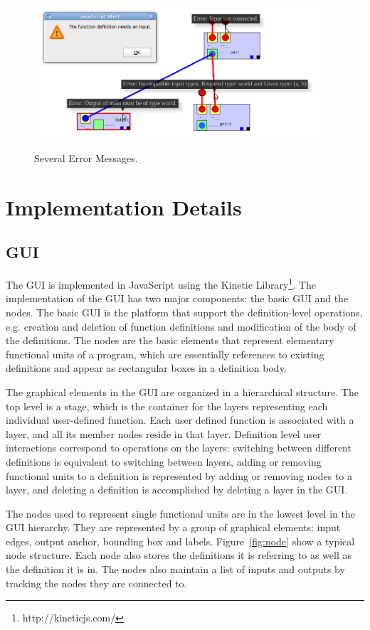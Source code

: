 \documentclass[12pt,UTF8,a4]{article}
\begin{document}
\begin{figure}[h!]
\center
\includegraphics[width=0.95\textwidth]{./images/error_displays_cropped.png} \\
\caption{Several Error Messages.}\label{fig:errors}
\end{figure}

\section{Implementation Details}
\subsection{GUI}
The GUI is implemented in JavaScript using the Kinetic Library\footnote{http://kineticjs.com/}. The implementation of the GUI has two major components: the basic GUI and the nodes. The basic GUI is the platform that support the definition-level operations, e.g. creation and deletion of function definitions and modification of the body of the definitions. The nodes are the basic elements that represent elementary functional units of a program, which are essentially references to existing definitions and appear as rectangular boxes in a definition body. 

The graphical elements in the GUI are organized in a hierarchical structure. The top level is a stage, which is the container for the layers representing each individual user-defined function. Each user defined function is associated with a layer, and all its member nodes reside in that layer. Definition level user interactions correspond to operations on the layers: switching between different definitions is equivalent to switching between layers, adding or removing functional units to a definition is represented by adding or removing nodes to a layer, and deleting a definition is accomplished by deleting a layer in the GUI.

The nodes used to represent single functional units are in the lowest level in the GUI hierarchy. They are represented by a group of graphical elements: input edges, output anchor, bounding box and labels. Figure~\ref{fig:node} show a typical node structure. Each node also stores the definitions it is referring to as well as the definition it is in. The nodes also maintain a list of inputs and outputs by tracking the nodes they are connected to.
\end{document}

